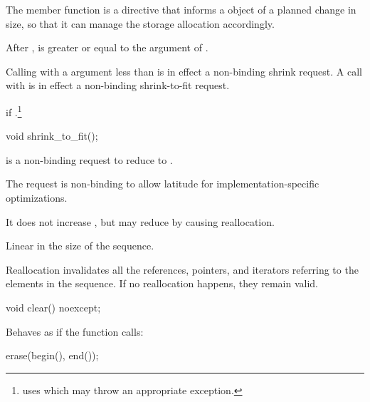 \begin{itemdescr}
\pnum
The member function
is a directive that informs a
object of a planned change in size,
so that it can manage the storage allocation accordingly.

\pnum
\effects
After
,
is greater or equal to the argument of
.
\begin{note}
Calling
with a  argument less than
is in effect a non-binding shrink request.
A call with
is in effect a non-binding shrink-to-fit request.
\end{note}

\pnum
\throws
{}
if
.\footnote{
uses
which may throw an appropriate exception.}
\end{itemdescr}

%
\begin{itemdecl}
void shrink_to_fit();
\end{itemdecl}

\begin{itemdescr}
\pnum
\effects {} is a non-binding request to reduce
 to . \begin{note} The request is non-binding to
allow latitude for implementation-specific optimizations. \end{note}
It does not increase , but may reduce 
by causing reallocation.

\pnum
\complexity Linear in the size of the sequence.

\pnum
\remarks Reallocation invalidates all the references, pointers, and iterators
referring to the elements in the sequence.
If no reallocation happens, they remain valid.
\end{itemdescr}

%
\begin{itemdecl}
void clear() noexcept;
\end{itemdecl}

\begin{itemdescr}
\pnum
\effects
Behaves as if the function calls:

\begin{codeblock}
erase(begin(), end());
\end{codeblock}
\end{itemdescr}

